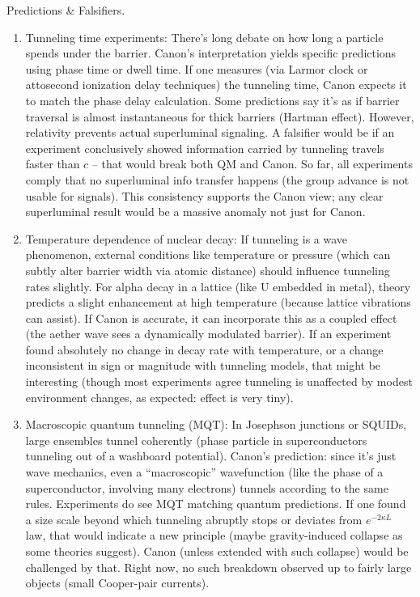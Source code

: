 \documentclass[11pt]{article}
\begin{document}
Predictions & Falsifiers.


\begin{enumerate}

\item 
Tunneling time experiments: There’s long debate on how long a particle spends under the barrier. Canon’s interpretation yields specific predictions using phase time or dwell time. If one measures (via Larmor clock or attosecond ionization delay techniques) the tunneling time, Canon expects it to match the phase delay calculation. Some predictions say it’s as if barrier traversal is almost instantaneous for thick barriers (Hartman effect). However, relativity prevents actual superluminal signaling. A falsifier would be if an experiment conclusively showed information carried by tunneling travels faster than $c$ – that would break both QM and Canon. So far, all experiments comply that no superluminal info transfer happens (the group advance is not usable for signals). This consistency supports the Canon view; any clear superluminal result would be a massive anomaly not just for Canon.




\item 
Temperature dependence of nuclear decay: If tunneling is a wave phenomenon, external conditions like temperature or pressure (which can subtly alter barrier width via atomic distance) should influence tunneling rates slightly. For alpha decay in a lattice (like U embedded in metal), theory predicts a slight enhancement at high temperature (because lattice vibrations can assist). If Canon is accurate, it can incorporate this as a coupled effect (the aether wave sees a dynamically modulated barrier). If an experiment found absolutely no change in decay rate with temperature, or a change inconsistent in sign or magnitude with tunneling models, that might be interesting (though most experiments agree tunneling is unaffected by modest environment changes, as expected: effect is very tiny).




\item 
Macroscopic quantum tunneling (MQT): In Josephson junctions or SQUIDs, large ensembles tunnel coherently (phase particle in superconductors tunneling out of a washboard potential). Canon’s prediction: since it’s just wave mechanics, even a “macroscopic” wavefunction (like the phase of a superconductor, involving many electrons) tunnels according to the same rules. Experiments do see MQT matching quantum predictions. If one found a size scale beyond which tunneling abruptly stops or deviates from $e^{-2\kappa L}$ law, that would indicate a new principle (maybe gravity-induced collapse as some theories suggest). Canon (unless extended with such collapse) would be challenged by that. Right now, no such breakdown observed up to fairly large objects (small Cooper-pair currents).




\end{enumerate}
\end{document}
